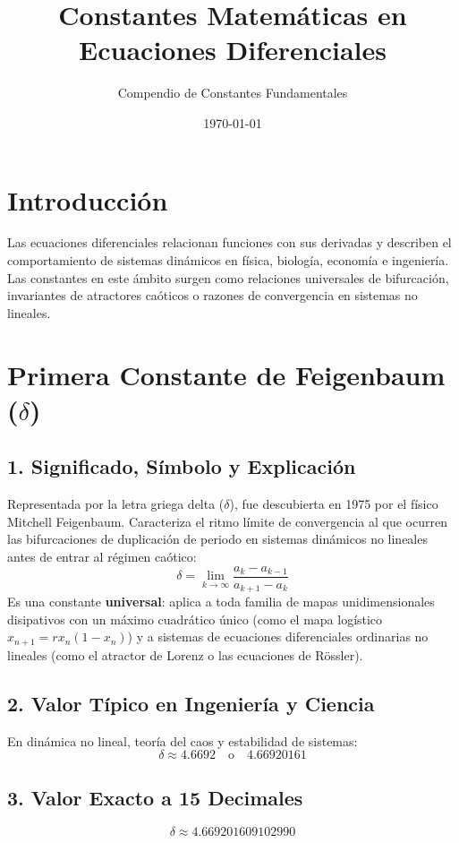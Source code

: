 \documentclass[12pt,a4paper]{article}
\title{\textbf{Constantes Matemáticas en Ecuaciones Diferenciales}}
\author{Compendio de Constantes Fundamentales}
\date{\today}
\begin{document}
\maketitle

\section*{Introducción}
Las ecuaciones diferenciales relacionan funciones con sus derivadas y describen el comportamiento de sistemas dinámicos en física, biología, economía e ingeniería. Las constantes en este ámbito surgen como relaciones universales de bifurcación, invariantes de atractores caóticos o razones de convergencia en sistemas no lineales.

\section{Primera Constante de Feigenbaum ($\delta$)}

\subsection*{1. Significado, Símbolo y Explicación}
Representada por la letra griega delta ($\delta$), fue descubierta en 1975 por el físico Mitchell Feigenbaum. Caracteriza el ritmo límite de convergencia al que ocurren las bifurcaciones de duplicación de periodo en sistemas dinámicos no lineales antes de entrar al régimen caótico:
\begin{equation*}
\delta = \lim_{k \to \infty} \frac{a_k - a_{k-1}}{a_{k+1} - a_k}
\end{equation*}
Es una constante \textbf{universal}: aplica a toda familia de mapas unidimensionales disipativos con un máximo cuadrático único (como el mapa logístico $x_{n+1} = r x_n (1-x_n)$) y a sistemas de ecuaciones diferenciales ordinarias no lineales (como el atractor de Lorenz o las ecuaciones de Rössler).

\subsection*{2. Valor Típico en Ingeniería y Ciencia}
En dinámica no lineal, teoría del caos y estabilidad de sistemas:
\begin{equation*}
\delta \approx 4.6692 \quad \text{o} \quad 4.66920161
\end{equation*}

\subsection*{3. Valor Exacto a 15 Decimales}
\begin{equation*}
\delta \approx 4.669201609102990
\end{equation*}
\end{document}
